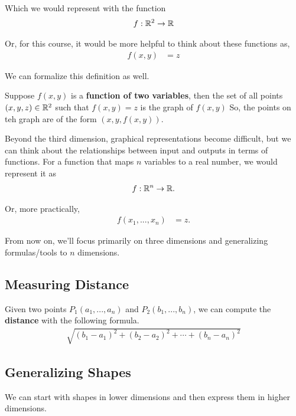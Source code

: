 Which we would represent with the function
\begin{align*}
    f : \mathbb{R}^2 \rightarrow \mathbb{R}
\end{align*}

Or, for this course, it would be more helpful to think about these functions as,
\begin{align*}
    f(x,y) &= z
\end{align*}

We can formalize this definition as well.

\begin{definition}
    Suppose $f(x,y)$ is a \textbf{function of two variables}, then the set of all points $(x,y,z) \in \mathbb{R}^2$ such that $f(x,y) = z$ is the graph of
    $f(x,y)$ So, the points on teh graph are of the form $(x, y, f(x,y))$.
\end{definition}

Beyond the third dimension, graphical representations become difficult, but we can think about the relationships between input and outputs in terms of 
functions. For a function that maps $n$ variables to a real number, we would represent it as
\begin{align*}
    f : \mathbb{R}^n \rightarrow \mathbb{R}.
\end{align*}

Or, more practically,
\begin{align*}
    f(x_1, ..., x_n) &= z.
\end{align*}

From now on, we'll focus primarily on three dimensions and generalizing formulas/tools to $n$ dimensions.

\subsection{Measuring Distance}
\begin{definition}
    Given two points $P_1(a_1, ..., a_n)$ and $P_2(b_1, ..., b_n)$, we can compute the \textbf{distance} with the following formula.
    \begin{align*}
        \sqrt{(b_1 - a_1)^2 + (b_2 - a_2)^2 + \cdots + (b_n - a_n)^2}
    \end{align*}
\end{definition}

\subsection{Generalizing Shapes}
We can start with shapes in lower dimensions and then express them in higher dimensions.

